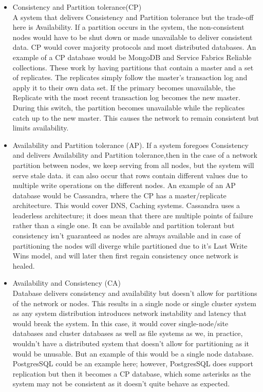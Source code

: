 \documentclass[a4paper,10pt,titlepage]{report}
\begin{document}
    \begin{itemize}
        \item Consistency and Partition tolerance(CP) \\ A system that delivers Consistency and Partition tolerance but the trade-off here is Availability. If a partition occurs in the system, the non-consistent nodes would have to be shut down or made unavailable to deliver consistent data. CP would cover majority protocols and most distributed databases. An example of a CP database would be MongoDB and Service Fabrics Reliable collections. These work by having partitions that contain a master and a set of replicates. The replicates simply follow the master's transaction log and apply it to their own data set. If the primary becomes unavailable, the Replicate with the most recent transaction log becomes the new master. During this switch, the partition becomes unavailable while the replicates catch up to the new master. This causes the network to remain consistent but limits availability. \\

        \item Availability and Partition tolerance (AP). If a system foregoes Consistency and delivers Availability and Partition tolerance,then in the case of a network partition between nodes, we keep serving from all nodes, but the system will serve stale data. it can also occur that rows contain different values due to multiple write operations on the different nodes. An example of an AP database would be Cassandra, where the CP has a master/replicate architecture. This would cover DNS, Caching systems. Cassandra uses a leaderless architecture; it does mean that there are multiple points of failure rather than a single one. It can be available and partition tolerant but consistency isn't guaranteed as nodes are always available and in case of partitioning the nodes will diverge while partitioned due to it's Last Write Wins model, and will later then first regain consistency once network is healed. \\

        \item Availability and Consistency (CA) \\ Database delivers consistency and availability but doesn't allow for partitions of the network or nodes. This results in a single node or single cluster system as any system distribution introduces network instability and latency that would break the system. In this case, it would cover single-node/site databases and cluster databases as well as file systems as we, in practice, wouldn't have a distributed system that doesn't allow for partitioning as it would be unusable. But an example of this would be a single node database. PostgresSQL could be an example here; however, PostgresSQL does support replication but then it becomes a CP database, which some asterisks as the system may not be consistent\cite{aphyrpostgres} as it doesn't quite behave as expected. \\
    \end{itemize}
\end{document}
